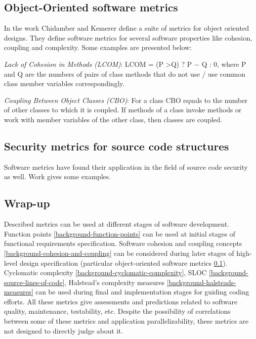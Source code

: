 \subsection{Object-Oriented software metrics}
\label{background-object-oriented-metrics}
\qquad In the work \cite{metrics-object-oriented-paper} Chidamber and Kemerer define a suite of metrics for object oriented designs. They define software metrics for several software properties like cohesion, coupling and complexity. Some examples are presented below:
\begin{description}[align=left,leftmargin=*]
\item\textit{Lack of Cohesion in Methods (LCOM)}:\newline
LCOM = (P \textgreater Q) ? P $-$ Q : 0, where P and Q are the numbers of pairs of class methods that do not use / use common class member variables correspondingly. 
\item\textit{Coupling Between Object Classes (CBO)}:\newline
For a class CBO equals to the number of other classes to which it is coupled. If methods of a class invoke methods or work with member variables of the other class, then classes are coupled.     
\end{description} 

\subsection{Security metrics for source code structures}
\label{background-security-metrics}
\qquad Software metrics have found their application in the field of source code security as well. Work \cite{metrics-security-paper} gives some examples.

\subsection{Wrap-up}
\qquad Described metrics can be used at different stages of software development. Function points \ref{background-function-points} can be used at initial stages of functional requirements specification. Software cohesion and coupling concepts \ref{background-cohesion-and-coupling} can be considered during later stages of high-level design specification (particular object-oriented software metrics \ref{background-object-oriented-metrics}). Cyclomatic complexity \ref{background-cyclomatic-complexity}, SLOC \ref{background-source-lines-of-code}, Halstead's complexity measures \ref{background-halsteads-measures} can be used during final and implementation stages for guiding coding efforts. All these metrics give assessments and predictions related to software quality, maintenance, testability, etc. Despite the possibility of correlations between some of these metrics and application parallelizability, these metrics are not designed to directly judge about it.

